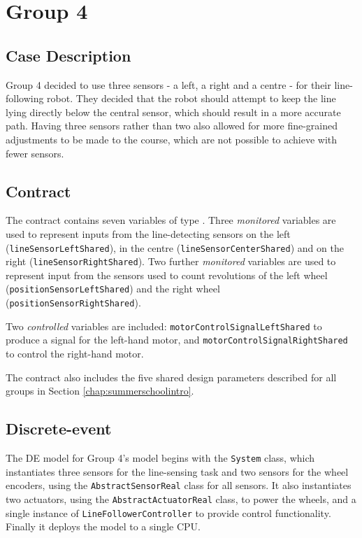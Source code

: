 \section{Group 4}
\subsection{Case Description}
Group 4 decided to use three sensors - a left, a right and a centre -
for their line-following robot.  They decided that the robot should
attempt to keep the line lying directly below the central sensor,
which should result in a more accurate path.  Having three sensors
rather than two also allowed for more fine-grained adjustments to be
made to the course, which are not possible to achieve with fewer
sensors.

\subsection{Contract} 
The contract contains seven variables of type . Three
\emph{monitored} variables are used to represent inputs from the
line-detecting sensors on the left (\texttt{lineSensorLeftShared}), in
the centre (\texttt{lineSensorCenterShared}) and on the right
(\texttt{lineSensorRight\-Sha\-red}).  Two further \emph{monitored}
variables are used to represent input from the sensors used to count
revolutions of the left wheel (\texttt{positionSensorLeftShared}) and
the right wheel (\texttt{position\-Sensor\-Right\-Sha\-red}).

Two \emph{controlled} variables are included:
\texttt{motorControlSignalLeftShared} to produce a signal for the
left-hand motor, and \texttt{motorControlSignalRightShared} to control
the right-hand motor.

The contract also includes the five shared design parameters described
for all groups in Section \ref{chap:summerschoolintro}.

\subsection{Discrete-event} 
The DE model for Group 4's model begins with the \texttt{System}
class, which instantiates three sensors for the line-sensing task and
two sensors for the wheel encoders, using the
\texttt{AbstractSensorReal} class for all sensors.  It also
instantiates two actuators, using the \texttt{AbstractActuatorReal}
class, to power the wheels, and a single instance of
\texttt{LineFollowerController} to provide control functionality.
Finally it deploys the model to a single CPU.

